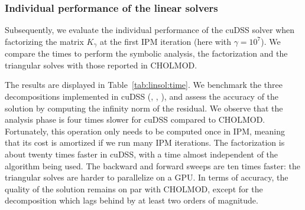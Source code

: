 \subsubsection{Individual performance of the linear solvers}
Subsequently, we evaluate the individual performance of the cuDSS solver when factorizing the matrix $K_{\gamma}$ at the first IPM iteration (here with $\gamma = 10^7$).
We compare the times to perform the symbolic analysis,
the factorization and the triangular solves with those reported in CHOLMOD.

The results are displayed in Table~\ref{tab:linsol:time}.
We benchmark the three decompositions implemented in cuDSS (\llt, \ldlt, \lu), and assess the accuracy of the solution by computing the infinity norm of the residual.
We observe that the analysis phase is four times slower for cuDSS compared to CHOLMOD.
Fortunately, this operation only needs to be computed once in IPM, meaning that its cost is amortized if we run many IPM iterations.
The factorization is about twenty times faster in cuDSS, with a time almost independent of the algorithm being used.
The backward and forward sweeps are ten times faster:
the triangular solves are harder to parallelize on a GPU.
In terms of accuracy, the quality of the solution remains on par with CHOLMOD, except for the \ldlt decomposition which lags behind by at least two orders of magnitude.


